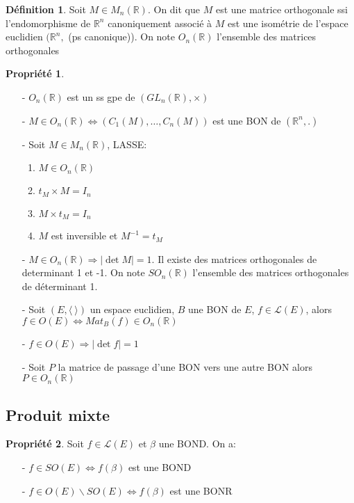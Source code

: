 \documentclass[fleqn]{article}
\theoremstyle{definition} \newtheorem*{defi}{D\'efinition}
\theoremstyle{definition} \newtheorem*{theo}{Th\'eor\`eme}
\theoremstyle{definition} \newtheorem*{coro}{Corollaire}
\theoremstyle{remark} \newtheorem*{rqs}{Remarques}
\theoremstyle{definition} \newtheorem*{prop}{Propri\'et\'e}
\begin{document}
\begin{defi}
	Soit $M \in M_n(\mathbb{R})$. On dit que $M$ est une matrice orthogonale ssi l'endomorphisme de $\mathbb{R}^n$ canoniquement
	associ\'e \`a $M$ est une isom\'etrie de l'espace euclidien $(\mathbb{R}^n,$ (ps canonique)). On note $O_n(\mathbb{R})$ l'ensemble des
	matrices orthogonales
\end{defi}

\begin{prop} $ $
	\begin{enumerate}
		\item [-] $O_n(\mathbb{R})$ est un ss gpe de $(GL_n(\mathbb{R}), \times)$
		\item [-] $M \in O_n(\mathbb{R}) \Leftrightarrow (C_1(M), \hdots, C_n(M))$ est une BON de $(\mathbb{R}^n, .)$
		\item [-] Soit $M \in M_n(\mathbb{R})$, LASSE:
			\begin{enumerate}
				\item $M \in O_n(\mathbb{R})$
				\item $t_M \times M = I_n$
				\item $M \times t_M = I_n$
				\item $M$ est inversible et $M^{-1} = t_M$
			\end{enumerate}
		\item [-] $M \in O_n(\mathbb{R}) \Rightarrow |\det M| = 1$.  Il existe des matrices orthogonales de determinant 1 et -1. On note
			$SO_n(\mathbb{R})$ l'ensemble des matrices orthogonales de d\'eterminant 1.
		\item [-] Soit $(E, \langle\  \rangle)$ un espace euclidien, $B$ une BON de $E$, $f \in \mathscr{L}(E)$, alors $f \in O(E)
			\Leftrightarrow Mat_B(f) \in O_n(\mathbb{R})$
		\item [-] $f \in O(E) \Rightarrow |\det f| = 1$
		\item [-] Soit $P$ la matrice de passage d'une BON vers une autre BON alors $P \in O_n(\mathbb{R})$
	\end{enumerate}
\end{prop}

\subsection{Produit mixte}

\begin{prop}
	Soit $f \in \mathscr{L}(E)$ et $\beta$ une BOND. On a:
	\begin{itemize}
		\item [-] $f \in SO(E) \Leftrightarrow f(\beta)$ est une BOND
		\item [-] $f \in O(E) \backslash SO(E) \Leftrightarrow f(\beta)$ est une BONR
	\end{itemize}
\end{prop}
\end{document}
